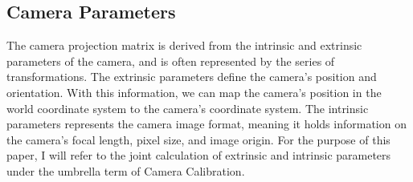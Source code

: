 \documentclass[10pt,twocolumn]{article}
\begin{document}
\subsection{Camera Parameters}
The camera projection matrix is derived from the intrinsic and extrinsic parameters of the camera, and is often represented by the series of transformations. The extrinsic parameters define the camera's position and orientation. With this information, we can map the camera's position in the world coordinate system to the camera's coordinate system. The intrinsic parameters represents the camera image format, meaning it holds information on the camera's focal length, pixel size, and image origin. For the purpose of this paper, I will refer to the joint calculation of extrinsic and intrinsic parameters under the umbrella term of Camera Calibration. 
\end{document}

